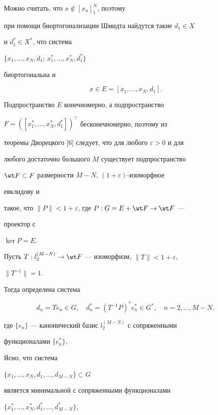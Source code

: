 \begin{pf} Можно считать, что $x\notin[x_n]^N_1$, поэтому 


при помощи биортогонализации Шмидта найдутся такие $d_1\in X$ 


и $d^*_1\in X^*$, что система 


$\{x_1,\dotsc,x_N,d_1;\,x^*_1,\dotsc,x^*_N,d^*_1\}$ 


биортогональна и 


\begin{equation} 


x\in E=[x_1,\dotsc,x_N,d_1]. 


\end{equation} 


Подпространство $E$ конечномерно, а подпространство 


$F=([x^*_1,\dotsc,x^*_N,d^*_1])^\top$ бесконечномерно, поэтому из 


теоремы Дворецкого [6] следует, что для любого $\varepsilon>0$ и для 


любого достаточно большого $M$ существует подпространство 


$\wt F\subset F$ размерности $M-N$, $(1+\varepsilon)$-изоморфное 


евклидову и 


такое, что $\|P\|<1+\varepsilon$, где $P:G=E+\wt F\to\wt F$ --- 


проектор с 


$\ker P=E$. 


 


Пусть $T:l^{(M-N)}_2\to\wt F$ --- изоморфизм, $\|T\|<1+\varepsilon$, 


$\|T^{-1}\|=1$. 


Тогда определена система 


$$ 


d_n=T e_n\in G,\quad d^*_n=(T^{-1}P)^*e^*_n\in G^*,\quad 


n=2,\dotsc,M-N, 


$$ 


где $\{e_n\}$ --- канонический базис $l^{(M-N)}_2$ с сопряженными 


функционалами $\{e^*_n\}$. 


Ясно, что система 


$\{x_1,\dotsc,x_N,d_1,\dotsc,d_{M-N}\}\subset G$ 


является минимальной с сопряженными функционалами 


$\{x^*_1,\dotsc,x^*_N,d^*_1,\dotsc,d^*_{M-N}\}$, 



\end{pf}
